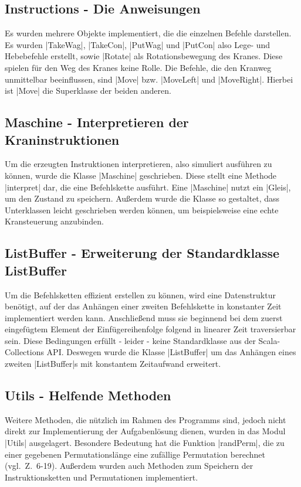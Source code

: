 \subsection{Instructions - Die Anweisungen}
Es wurden mehrere Objekte implementiert, die die einzelnen Befehle darstellen.
Es wurden |TakeWag|, |TakeCon|, |PutWag| und |PutCon| also Lege- und Hebebefehle erstellt, sowie |Rotate| als Rotationsbewegung des Kranes.
Diese spielen für den Weg des Kranes keine Rolle.
Die Befehle, die den Kranweg unmittelbar beeinflussen, sind |Move| bzw. |MoveLeft| und |MoveRight|. Hierbei ist |Move| die Superklasse der beiden anderen.

\subsection{Maschine - Interpretieren der Kraninstruktionen}
Um die erzeugten Instruktionen interpretieren, also simuliert ausführen zu können, wurde die Klasse |Maschine| geschrieben.
Diese stellt eine Methode |interpret| dar, die eine Befehlskette ausführt.
Eine |Maschine| nutzt ein |Gleis|, um den Zustand zu speichern.
Außerdem wurde die Klasse so gestaltet, dass Unterklassen leicht geschrieben werden können, um beispielsweise eine echte Kransteuerung anzubinden.

\subsection{ListBuffer - Erweiterung der Standardklasse ListBuffer}
 Um die Befehlsketten effizient erstellen zu können, wird eine Datenstruktur benötigt,
  auf der das Anhängen einer zweiten Befehlskette in konstanter Zeit implementiert werden kann.
 Anschließend muss sie beginnend bei dem zuerst eingefügtem Element der Einfügereihenfolge folgend in linearer Zeit traversierbar sein.
 Diese Bedingungen erfüllt - leider - keine Standardklasse aus der Scala-Collections API.
 Deswegen wurde die Klasse |ListBuffer| um das Anhängen eines zweiten |ListBuffer|s mit konstantem Zeitaufwand erweitert.

\subsection{Utils - Helfende Methoden}
 Weitere Methoden, die nützlich im Rahmen des Programms sind, jedoch nicht direkt zur Implementierung der Aufgabenlösung dienen,
  wurden in das Modul |Utils| ausgelagert. Besondere Bedeutung hat die Funktion |randPerm|, die zu einer gegebenen Permutationslänge
  eine zufällige Permutation berechnet (vgl.\ Z.\ 6-19).
 Außerdem wurden auch Methoden zum Speichern der Instruktionsketten und Permutationen implementiert.

